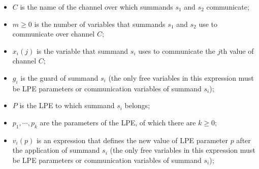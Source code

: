 \begin{itemize}
\item $C$ is the name of the channel over which summands $s_1$ and $s_2$ communicate;
\item $m \geq 0$ is the number of variables that summands $s_1$ and $s_2$ use to communicate over channel $C$;
\item $x_i(j)$ is the variable that summand $s_i$ uses to communicate the $j$th value of channel $C$;
\item $g_i$ is the guard of summand $s_i$ (the only free variables in this expression must be LPE parameters or communication variables of summand $s_i$);
\item $P$ is the LPE to which summand $s_i$ belongs;
\item $p_1, \cdots{}, p_k$ are the parameters of the LPE, of which there are $k \geq 0$;
\item $v_i(p)$ is an expression that defines the new value of LPE parameter $p$ after the application of summand $s_i$ (the only free variables in this expression must be LPE parameters or communication variables of summand $s_i$);
\end{itemize}

